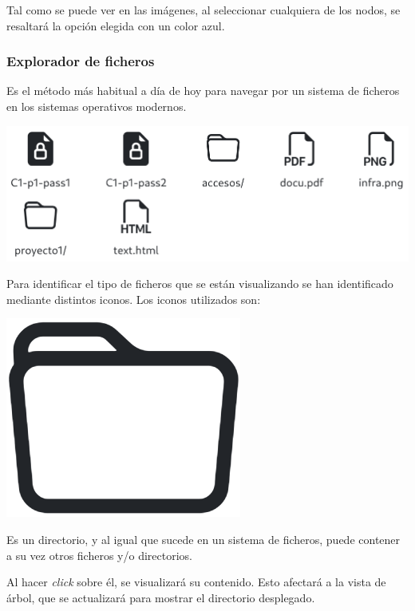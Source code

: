 \documentclass{\ClassPath/viu-tfm-template}
\begin{document}
Tal como se puede ver en las imágenes, al seleccionar cualquiera de los nodos, se resaltará la opción elegida con un color azul.

\subsubsection*{Explorador de ficheros}

Es el método más habitual a día de hoy para navegar por un sistema de ficheros en los sistemas operativos modernos.

\begin{center}
    \includegraphics[width=0.9\linewidth]{img/browser.png}
\end{center}

Para identificar el tipo de ficheros que se están visualizando se han identificado mediante distintos iconos. Los iconos utilizados son:

{
\begin{minipage}{0.1\linewidth}
    \includegraphics[width=\linewidth]{img/folder.png}
\end{minipage}
\hspace{0.5cm}
\begin{minipage}{0.9\linewidth}
    Es un directorio, y al igual que sucede en un sistema de ficheros, puede contener a su vez otros ficheros y/o directorios.

    Al hacer \textit{click} sobre él, se visualizará su contenido. Esto afectará a la vista de árbol, que se actualizará para mostrar el directorio desplegado.
\end{minipage}
}
\end{document}
